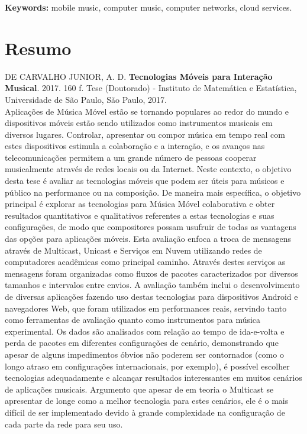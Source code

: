 \documentclass[11pt,twoside,a4paper]{book}
\begin{document}
	\noindent \textbf{Keywords:} mobile music, computer music, computer networks, cloud services.
	
	\chapter*{Resumo}
	
	\noindent DE CARVALHO JUNIOR, A. D. \textbf{Tecnologias Móveis para Interação Musical}. 
	2017. 160 f.
	Tese (Doutorado) - Instituto de Matemática e Estatística,
	Universidade de São Paulo, São Paulo, 2017.
	\\
	
	Aplicações de Música Móvel estão se tornando populares ao redor do mundo e dispositivos móveis estão sendo utilizados como instrumentos musicais em diversos lugares.
	Controlar, apresentar ou compor música em tempo real com estes dispositivos estimula a colaboração e a interação, e os avanços nas telecomunicações permitem a um grande número de pessoas cooperar musicalmente através de redes locais ou da Internet.
	Neste contexto, o objetivo desta tese é avaliar as tecnologias móveis que podem ser úteis para músicos e público na performance ou na composição.
	De maneira mais específica, o objetivo principal é explorar as tecnologias para Música Móvel colaborativa e obter resultados quantitativos e qualitativos referentes a estas tecnologias e suas configurações, de modo que compositores possam usufruir de todas as vantagens das opções para aplicações móveis.
	Esta avaliação enfoca a troca de mensagens através de Multicast, Unicast e Serviços em Nuvem utilizando redes de computadores acadêmicas como principal caminho.
	Através destes serviços as mensagens foram organizadas como fluxos de pacotes caracterizados por diversos tamanhos e intervalos entre envios.
	A avaliação também inclui o desenvolvimento de diversas aplicações fazendo uso destas tecnologias para dispositivos Android e navegadores Web, que foram utilizados em performances reais, servindo tanto como ferramentas de avaliação quanto como instrumentos para música experimental.
	Os dados são analisados com relação ao tempo de ida-e-volta e perda de pacotes em diferentes configurações de cenário, demonstrando que apesar de alguns impedimentos óbvios não poderem ser contornados (como o longo atraso em configurações internacionais, por exemplo), é possível escolher tecnologias adequadamente e alcançar resultados interessantes em muitos cenários de aplicações musicais.
	Argumento que apesar de em teoria o Multicast se apresentar de longe como a melhor tecnologia para estes cenários, ele é o mais difícil de ser implementado devido à grande complexidade na configuração de cada parte da rede para seu uso.
\end{document}
